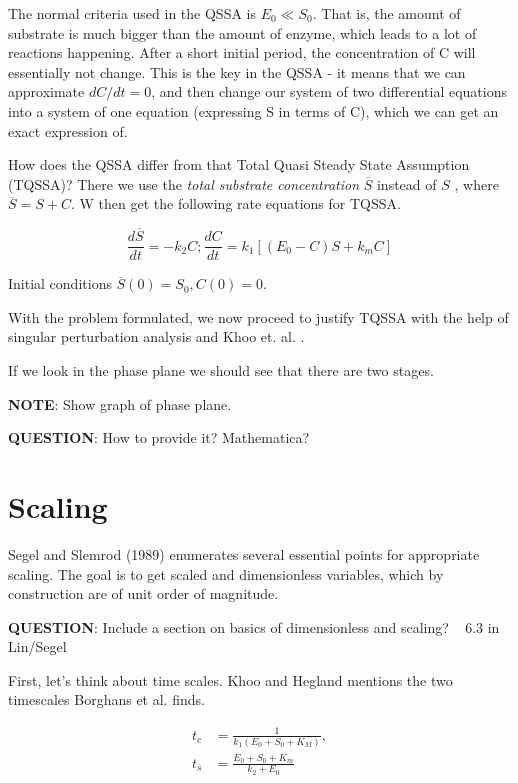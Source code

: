 \documentclass[12pt]{report}
\begin{document}
The normal criteria used in the QSSA is $ E_0 \ll S_0 $. That is, the amount of substrate is much bigger than the amount of enzyme, which leads to a lot of reactions happening. After a short initial period, the concentration of C will essentially not change. This is the key in the QSSA - it means that we can approximate $dC/dt=0$, and then change our system of two differential equations into a system of one equation (expressing S in terms of C), which we can get an exact expression of.

How does the QSSA differ from that Total Quasi Steady State Assumption (TQSSA)? There we use the \textit{total substrate concentration} $\overline{S}$ instead of $S$ \cite{Borghans}, where $\overline{S} = S + C$. W then get the following rate equations for TQSSA.

\begin{equation}
\frac{d\overline{S}}{dt} = -k_2C;
\frac{dC}{dt} = k_1[(E_0-C)S + k_mC]
\end{equation}

Initial conditions $\overline{S}(0)=S_0, C(0)=0$.

With the problem formulated, we now proceed to justify TQSSA with the help of singular perturbation analysis and Khoo et. al. \cite{Khoo}.

If we look in the phase plane we should see that there are two stages.

\textbf{NOTE}: Show graph of phase plane.

\textbf{QUESTION}: How to provide it? Mathematica?

\section{Scaling}

Segel and Slemrod (1989) enumerates several essential points for appropriate scaling. The goal is to get scaled and dimensionless variables, which by construction are of unit order of magnitude.

\textbf{QUESTION}: Include a section on basics of dimensionless and scaling? ~ 6.3 in Lin/Segel

First, let's think about time scales. Khoo and Hegland mentions the two timescales Borghans et al. finds.

\begin{align*}
t_c &= \frac{1}{k_1(E_0+S_0+K_M)}, \\
t_{\overline{s}} &= \frac{E_0+S_0+K_m}{k_2+E_0}
\end{align*}
\end{document}
